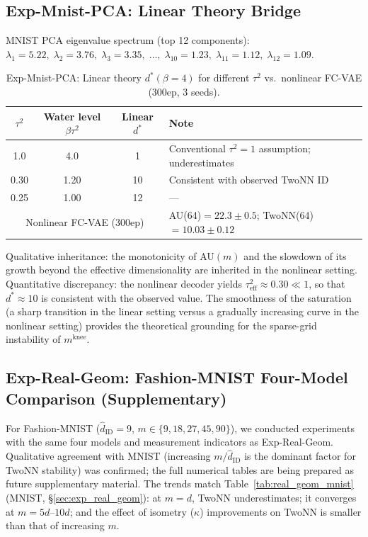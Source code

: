 \documentclass[make,article,submit,pdftex,moreauthors]{Definitions/mdpi}
\newcommand{\kap}{\kappa}
\newcommand{\mknee}{m^{\mathrm{knee}}}
\begin{document}
\subsection*{Exp-Mnist-PCA: Linear Theory Bridge}

MNIST PCA eigenvalue spectrum (top 12 components):
$\lambda_1=5.22,\; \lambda_2=3.76,\; \lambda_3=3.35,\;\ldots,\;\lambda_{10}=1.23,\; \lambda_{11}=1.12,\; \lambda_{12}=1.09$.

\begin{table}[H]
\centering
\caption{Exp-Mnist-PCA: Linear theory $d^*(\beta=4)$ for different $\tau^2$ vs.\ nonlinear FC-VAE (300ep, 3 seeds).}
\label{tab:theory_pred}
\small
\begin{tabular}{ccc|l}
\toprule
$\tau^2$ & Water level $\beta\tau^2$ & Linear $d^*$ & Note \\
\midrule
1.0  & 4.0  & 1   & Conventional $\tau^2=1$ assumption; underestimates \\
0.30 & 1.20 & 10  & Consistent with observed TwoNN ID \\
0.25 & 1.00 & 12  & --- \\
\midrule
\multicolumn{3}{c|}{Nonlinear FC-VAE (300ep)} & AU(64)$=22.3\pm0.5$; TwoNN(64)$=10.03\pm0.12$ \\
\bottomrule
\end{tabular}
\end{table}

Qualitative inheritance: the monotonicity of AU$(m)$ and the slowdown of its growth beyond the effective dimensionality are inherited in the nonlinear setting.
Quantitative discrepancy: the nonlinear decoder yields $\tau^2_\mathrm{eff} \approx 0.30 \ll 1$, so that $d^* \approx 10$ is consistent with the observed value.
The smoothness of the saturation (a sharp transition in the linear setting versus a gradually increasing curve in the nonlinear setting) provides the theoretical grounding for the sparse-grid instability of $\mknee$.

\subsection*{Exp-Real-Geom: Fashion-MNIST Four-Model Comparison (Supplementary)}

For Fashion-MNIST ($\hat{d}_\mathrm{ID}=9$, $m \in \{9,18,27,45,90\}$),
we conducted experiments with the same four models and measurement indicators as Exp-Real-Geom.
Qualitative agreement with MNIST (increasing $m/\hat{d}_\mathrm{ID}$ is the dominant factor for TwoNN stability)
was confirmed; the full numerical tables are being prepared as future supplementary material.
The trends match Table~\ref{tab:real_geom_mnist} (MNIST, \S\ref{sec:exp_real_geom}):
at $m = d$, TwoNN underestimates; it converges at $m = 5d$--$10d$;
and the effect of isometry ($\kap$) improvements on TwoNN is smaller than that of increasing $m$.
\end{document}
